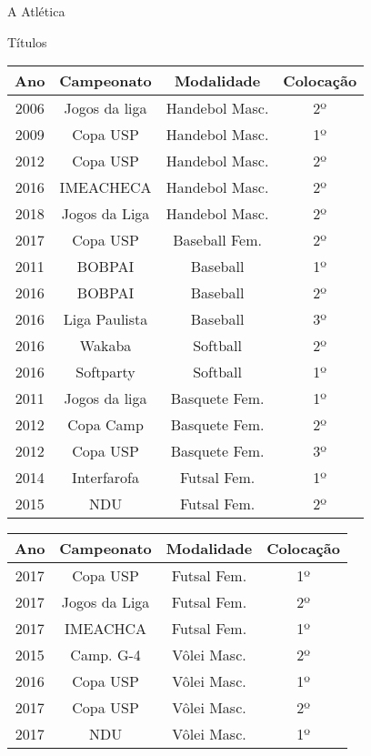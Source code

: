 \begin{secao}{A Atlética}
\begin{subsecao}{Títulos}
\begin{center}
  \begin{tabular}{c|c|c|c}
    Ano & Campeonato & Modalidade & Colocação\\
    \hline
    2006 & Jogos da liga  & Handebol Masc.  & 2º\\
    2009 & Copa USP       & Handebol Masc.  & 1º\\
    2012 & Copa USP       & Handebol Masc.  & 2º\\
    2016 & IMEACHECA      & Handebol Masc.  & 2º\\
    2018 & Jogos da Liga  & Handebol Masc.  & 2º\\
    2017 & Copa USP       & Baseball Fem.   & 2º\\
    2011 & BOBPAI         & Baseball        & 1º\\
    2016 & BOBPAI         & Baseball        & 2º\\
    2016 & Liga Paulista  & Baseball        & 3º\\
    2016 & Wakaba         & Softball        & 2º\\
    2016 & Softparty      & Softball        & 1º\\
    2011 & Jogos da liga  & Basquete Fem.   & 1º\\
    2012 & Copa Camp      & Basquete Fem.   & 2º\\
    2012 & Copa USP       & Basquete Fem.   & 3º\\
    2014 & Interfarofa    & Futsal Fem.     & 1º\\
    2015 & NDU            & Futsal Fem.     & 2º\\
  \end{tabular}
\end{center}
\begin{center}
  \begin{tabular}{c|c|c|c}
    Ano & Campeonato & Modalidade & Colocação\\
    \hline
    2017 & Copa USP       & Futsal Fem.     & 1º\\
    2017 & Jogos da Liga  & Futsal Fem.     & 2º\\
    2017 & IMEACHCA       & Futsal Fem.     & 1º\\
    2015 & Camp. G-4      & Vôlei Masc.     & 2º\\
    2016 & Copa USP       & Vôlei Masc.     & 1º\\
    2017 & Copa USP       & Vôlei Masc.     & 2º\\
    2017 & NDU            & Vôlei Masc.     & 1º\\

\end{tabular}
\end{center}
\end{subsecao}
\end{secao}
